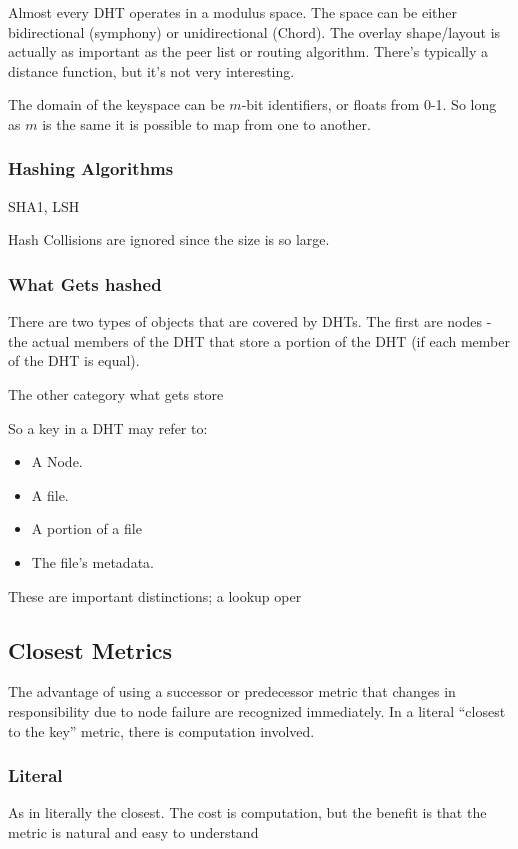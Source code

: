 \documentclass[10pt,letterpaper]{report}
\begin{document}
Almost every DHT operates in a modulus space.  The space can be either bidirectional (symphony) or unidirectional (Chord).
The overlay shape/layout is actually as important as the peer list or  routing algorithm.
There's typically a distance function, but it's not very interesting.


The domain of the keyspace can be $m$-bit identifiers, or floats from 0-1.  So long as $m$ is the same it is possible to map from one to another.

\subsubsection{Hashing Algorithms}
SHA1, LSH

Hash Collisions are ignored since the size is so large.
\subsubsection{What Gets hashed}
There are two types of objects that are covered by DHTs.  
The first are nodes - the actual members of the DHT that store a portion of the DHT (if each member of the DHT is equal).

The other category what gets store

So a key in a DHT may refer to:
\begin{itemize}
	\item A Node.
	\item A file.
	\item A portion of a file
	\item The file's metadata.
\end{itemize}

These are important distinctions; a lookup oper

\subsection{Closest Metrics}

The advantage of using a successor or predecessor metric that changes in responsibility due to node failure are recognized immediately.  
In a literal ``closest to the key'' metric, there is computation involved.


\subsubsection{Literal}
As in literally the closest.  The cost is computation, but the benefit is that the metric is natural and easy to understand
\end{document}
